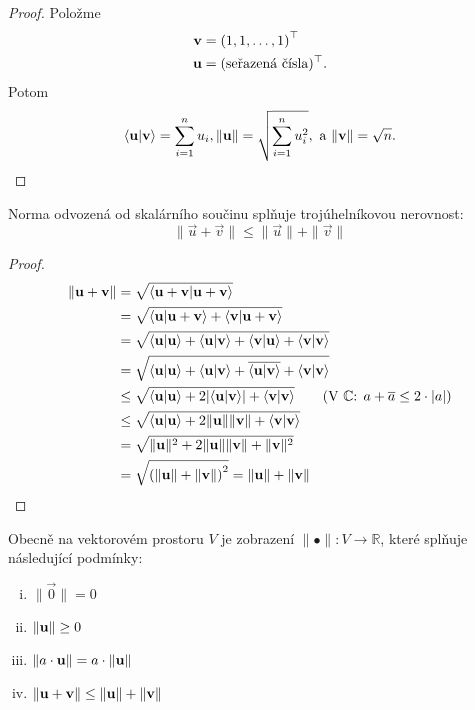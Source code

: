 \begin{proof}
    Položme 
    \begin{align*} 
        \mathbf{v} &= \left( 1,1,\dots,1\right)^\top \\
        \mathbf{u} &= (\text{seřazená čísla})^\top.
    \end{align*}
    Potom 
    $$\langle \mathbf{u} | \mathbf{v} \rangle = \sum_{i=1}^n u_i, 
    \|\mathbf{u}\| = \sqrt{\sum_{i=1}^n u_i^2}, \text{ a }
    \|\mathbf{v}\| = \sqrt{n}.$$
\end{proof}

\begin{corollary}
    Norma odvozená od skalárního součinu splňuje trojúhelníkovou nerovnost:
    $$\|\vec{u} + \vec{v}\| \leq \|\vec{u}\| + \|\vec{v}\|$$
\end{corollary}

\begin{proof}
    \begin{align*}
        \|\vec{u} + \vec{v}\| &= \sqrt{\scp{\vec{u} + \vec{v}}{\vec{u} + 
            \vec{v}}} \\
            &= \sqrt{\scp{\vu}{\vu + \vv} + \scp{\vv}{\vu + \vv}} \\
            &= \sqrt{\scp{\vu}{\vu} + \scp{\vu}{\vv} + \scp{\vv}{\vu} 
                + \scp{\vv}{\vv}} \\
            &= \sqrt{\scp{\vu}{\vu} + \scp{\vu}{\vv} + 
                \overline{\scp{\vu}{\vv}} + \scp{\vv}{\vv}} \\
            &\leq \sqrt{\scp{\vu}{\vu} + 2|\scp{\vu}{\vv}| + \scp{\vv}{\vv}}
                \tag{V $\mathbb{C}$: $a + \overline{a} \leq 2 \cdot |a|$} \\
            &\leq \sqrt{\scp{\vu}{\vu} + 2\|\vu\|\|\vv\| + \scp{\vv}{\vv}} \\
            &= \sqrt{\|\vu\|^2 + 2\|\vu\|\|\vv\| + \|\vv\|^2} \\
            &= \sqrt{\left(\|\vu\| + \|\vv\|\right)^2} = \|\vu\| + \|\vv\|
    \end{align*}
\end{proof}

\begin{definition}
    Obecně  na vektorovém prostoru $V$ je zobrazení 
    $\|\bullet\|: V \rightarrow \mathbb{R}$, které splňuje následující
    podmínky:
    \begin{enumerate}[i.]
        \item $\|\vec{0}\| = 0$
        \item $\|\mathbf{u}\| \geq 0$
        \item $\|a \cdot \mathbf{u}\| = a \cdot \|\mathbf{u}\|$
        \item $\|\mathbf{u} + \mathbf{v}\| \leq \|\mathbf{u}\| + \|\mathbf{v}\|$
    \end{enumerate}
\end{definition}

